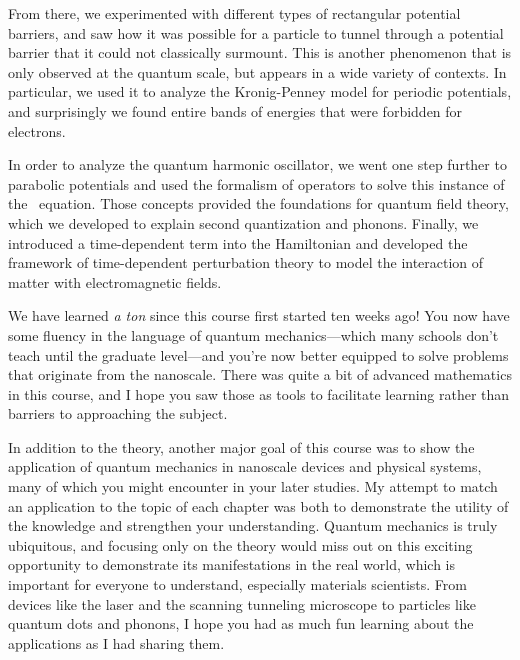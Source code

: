 From there, we experimented with different types of rectangular potential barriers, and saw how it was possible for a particle to tunnel through a potential barrier that it could not classically surmount. 
This is another phenomenon that is only observed at the quantum scale, but appears in a wide variety of contexts. 
In particular, we used it to analyze the Kronig-Penney model for periodic potentials, and surprisingly we found entire bands of energies that were forbidden for electrons.

In order to analyze the quantum harmonic oscillator, we went one step further to parabolic potentials and used the formalism of operators to solve this instance of the \Sch\ equation. 
Those concepts provided the foundations for quantum field theory, which we developed to explain second quantization and phonons. 
Finally, we introduced a time-dependent term into the Hamiltonian and developed the framework of time-dependent perturbation theory to model the interaction of matter with electromagnetic fields. 

We have learned \emph{a ton} since this course first started ten weeks ago! 
You now have some fluency in the language of quantum mechanics---which many schools don't teach until the graduate level---and you're now better equipped to solve problems that originate from the nanoscale. 
There was quite a bit of advanced mathematics in this course, and I hope you saw those as tools to facilitate learning rather than barriers to approaching the subject.

In addition to the theory, another major goal of this course was to show the application of quantum mechanics in nanoscale devices and physical systems, many of which you might encounter in your later studies. 
My attempt to match an application to the topic of each chapter was both to demonstrate the utility of the knowledge and strengthen your understanding. 
Quantum mechanics is truly ubiquitous, and focusing only on the theory would miss out on this exciting opportunity to demonstrate its manifestations in the real world, which is important for everyone to understand, especially materials scientists. 
From devices like the laser and the scanning tunneling microscope to particles like quantum dots and phonons, I hope you had as much fun learning about the applications as I had sharing them.


